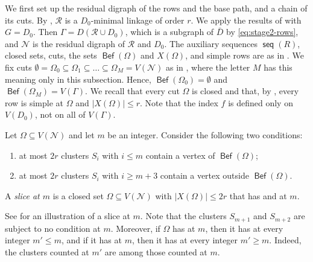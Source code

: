 \documentclass[fontsize=12pt,leading=14pt]{fullpaper}
\DeclareMathOperator{\Bef}{\mathsf{Bef}}
\DeclareMathOperator{\seq}{\mathsf{seq}}
\newcommand{\Ncal}{\mathcal{N}}
\newcommand{\Rcal}{\mathcal{R}}
\begin{document}
We first set up the residual digraph of the rows and the base path, and a chain of its cuts.
By , $\Rcal$ is a $D_0$-minimal linkage of order $r$.
We apply the results of  with $G=D_0$.
Then $\Gamma=D(\Rcal\cup D_0)$, which is a subgraph of $\bar D$ by \eqref{eq:stage2-rows}, and $\Ncal$ is the residual digraph of $\Rcal$ and $D_0$.
The auxiliary sequences $\seq(R)$, closed sets, cuts, the sets $\Bef(\Omega)$ and $X(\Omega)$, and simple rows are as in .
We fix cuts $\emptyset=\Omega_0\subseteq\Omega_1\subseteq\dots\subseteq\Omega_M=V(\Ncal)$ as in , where the letter $M$ has this meaning only in this subsection.
Hence, $\Bef(\Omega_0)=\emptyset$ and $\Bef(\Omega_M)=V(\Gamma)$.
We recall that every cut $\Omega$ is closed and that, by , every row is simple at $\Omega$ and $|X(\Omega)|\le r$.
Note that the index $f$ is defined only on $V(D_0)$, not on all of $V(\Gamma)$.

\begin{definition}[Slices]\label{def:slice}
  Let $\Omega\subseteq V(\Ncal)$ and let $m$ be an integer.
  Consider the following two conditions:
  \begin{enumerate}[label=\textnormal{(S\arabic*)}]
    \item\label{item:slice-S1} at most $2r$ clusters $S_i$ with $i\le m$ contain a vertex of $\Bef(\Omega)$;
    \item\label{item:slice-S2} at most $2r$ clusters $S_i$ with $i\ge m+3$ contain a vertex outside $\Bef(\Omega)$.
  \end{enumerate}
  A \emph{slice at $m$} is a closed set $\Omega\subseteq V(\Ncal)$ with $|X(\Omega)|\le2r$ that has  and  at $m$.
\end{definition}

See  for an illustration of a slice at $m$.
Note that the clusters $S_{m+1}$ and $S_{m+2}$ are subject to no condition at $m$.
Moreover, if $\Omega$ has  at $m$, then it has  at every integer $m'\le m$, and if it has  at $m$, then it has  at every integer $m'\ge m$.
Indeed, the clusters counted at $m'$ are among those counted at $m$.
\end{document}
